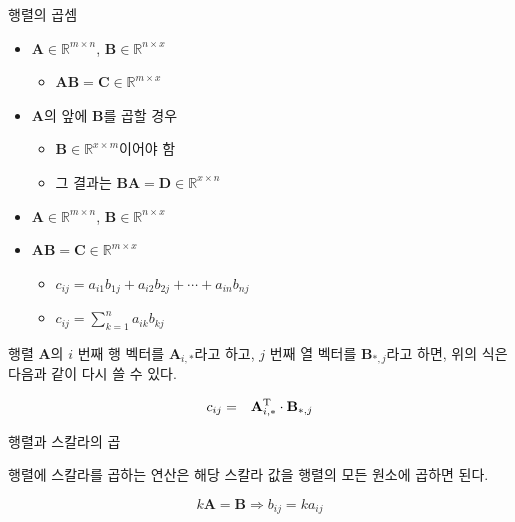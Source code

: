 \documentclass{beamer}
\begin{document}
\begin{frame}{행렬의 곱셈}

\begin{itemize}
\item $\mathbf A \in \mathbb R^{m \times n}$,  $\mathbf B \in \mathbb R^{n \times x}$
	\begin{itemize}
	\item $\mathbf {AB} = \mathbf C \in \mathbb R^{m \times x}$
	\end{itemize}
\end{itemize}

\begin{itemize}
\item $\mathbf A$의 앞에 $\mathbf B$를 곱할 경우
	\begin{itemize}
	\item $\mathbf B \in \mathbb R^{x \times m}$이어야 함
	\item 그 결과는 $\mathbf {BA} = \mathbf D \in \mathbb R^{x \times n}$
	\end{itemize}
\end{itemize}

\begin{itemize}
\item $\mathbf A \in \mathbb R^{m \times n}$, $\mathbf B \in \mathbb R^{n \times x}$
\item $\mathbf {AB} = \mathbf C \in \mathbb R^{m \times x}$
	\begin{itemize}
	\item $c_{ij}  =  a_{i1}b_{1j} + a_{i2}b_{2j} + \cdots + a_{in}b_{nj} $
	\item $c_{ij}  = \sum_{k=1}^n a_{ik} b_{kj}$
	\end{itemize}
\end{itemize}

행렬 $\mathbf A$의 $i$ 번째 행 벡터를 $\mathbf A_{i,*}$라고 하고, $j$ 번째 열 벡터를 $\mathbf B_{*,j}$라고 하면,
위의 식은 다음과 같이 다시 쓸 수 있다.

\begin{eqnarray}
c_{ij} & =  & \mathbf A_{i,*}^{\rm T} \cdot \mathbf B_{*,j}
\end{eqnarray}

\end{frame}


\begin{frame}{행렬과 스칼라의 곱}

행렬에 스칼라를 곱하는 연산은 해당 스칼라 값을 행렬의 모든 원소에 곱하면 된다.

$$k \mathbf A  = \mathbf B \Rightarrow b_{ij} = k a_{ij}$$

\end{frame}
\end{document}

